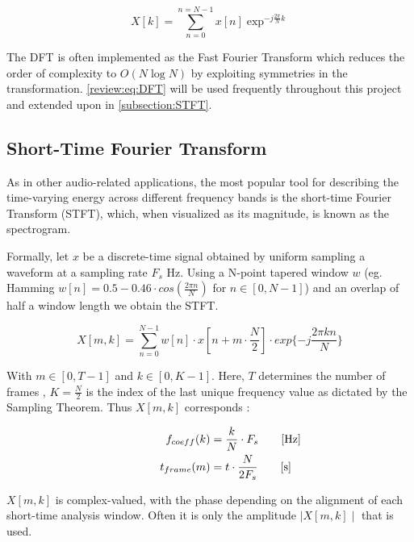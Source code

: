 \begin{equation}
  X[k] =\sum_{n=0}^{n=N-1} x[n] \exp^{-j \frac{2 \pi}{N} k }
  \label{review:eq:DFT}
\end{equation}

The DFT is often implemented as the Fast Fourier Transform which reduces the
order of complexity to $O(N\log{N})$ by exploiting symmetries in the
transformation. \cite{OppenheimDSP} \autoref{review:eq:DFT} will be used
frequently throughout this project and extended upon in
\autoref{subsection:STFT}.

\subsection{Short-Time Fourier Transform}
\label{subsection:STFT}

As in other audio-related applications, the most popular tool for describing the
time-varying energy across different frequency bands is the short-time Fourier
Transform (STFT), which, when visualized as its magnitude, is known as the
spectrogram.

Formally, let $x$ be a discrete-time signal obtained by uniform sampling a
waveform at a sampling rate $F_{s}$ Hz. Using a N-point tapered window $w$ (eg.
Hamming $w[n] = 0.5-0.46\cdot cos(\frac{2\pi n}{N})$ for
$n\in\left[0,N-1\right]$) and an overlap of half a window length we obtain the
STFT.

\begin{equation}
  X [m,k] = \sum_{n=0}^{N-1}w[n]\cdot x[n + m\cdot\frac{N}{2}]\cdot exp\{-j\frac{2\pi k n }{N}\}
\end{equation}

With $m\in\left[0,T-1\right]$ and $k\in\left[0,K-1\right]$. Here, $T$ determines
the number of frames , $K = \frac{N}{2}$ is the index of the last unique
frequency value as dictated by the Sampling Theorem. Thus $X[m,k]$ corresponds :

\begin{equation}
  \begin{aligned}
    f_{coeff}(k) & = \frac{k}{N} \cdot F_{s} \mathrlap{\qquad [\si{\hertz}]}   \\
    t_{frame}(m) & = t \cdot \frac{N}{2F_{s}} \mathrlap{\qquad [\si{\second}]}
  \end{aligned}
  \label{review:eq:tradeoff}
\end{equation}

$X[m,k]$ is complex-valued, with the phase depending on the alignment of each
short-time analysis window. Often it is only the amplitude $\mid X[m,k] \mid$
that is used.
\cite{OppenheimDSP}

